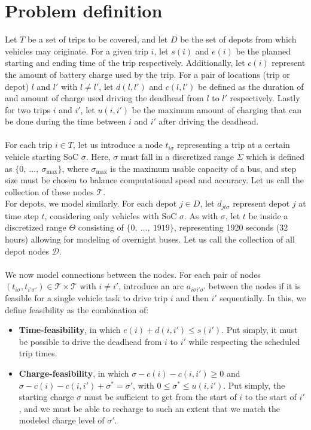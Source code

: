 \documentclass[]{article}
\begin{document}
\section{Problem definition}
\label{sec:problem_def}
Let $T$ be a set of trips to be covered, and let $D$ be the set of depots from which vehicles may originate. For a given trip $i$, let $s(i)$ and $e(i)$ be the planned starting and ending time of the trip respectively. Additionally, let $c(i)$ represent the amount of battery charge used by the trip. For a pair of locations (trip or depot) $l$ and $l'$ with $l \neq l'$, let $d(l, l')$ and $c(l, l')$ be defined as the duration of and amount of charge used driving the deadhead from $l$ to $l'$ respectively. Lastly for two trips $i$ and $i'$, let $u(i, i')$ be the maximum amount of charging that can be done during the time between $i$ and $i'$ after driving the deadhead.  \\\\
For each trip $i \in T$, let us introduce a node $t_{i\sigma}$ representing a trip at a certain vehicle starting SoC $\sigma$. Here, $\sigma$ must fall in a discretized range $\Sigma$ which is defined as $\{0,\:\dots,\:\sigma_{\max}\}$, where $\sigma_{\max}$ is the maximum usable capacity of a bus, and step size must be chosen to balance computational speed and accuracy. Let us call the collection of these nodes $\mathcal{T}$.\\
\noindent For depots, we model similarly. For each depot $j \in D$, let $d_{jt\sigma}$ represent depot $j$ at time step $t$, considering only vehicles with SoC $\sigma$. As with $\sigma$, let $t$ be inside a discretized range $\Theta$ consisting of $\{0,\:\dots,\:1919\}$, representing 1920 seconds (32 hours) allowing for modeling of overnight buses. Let us call the collection of all depot nodes $\mathcal{D}$. \\\\
We now model connections between the nodes. For each pair of nodes $(t_{i\sigma}, t_{i'\sigma'}) \in \mathcal{T} \times \mathcal{T}$ with $i \neq i'$, introduce an arc $a_{i\sigma i'\sigma'}$ between the nodes if it is feasible for a single vehicle task to drive trip $i$ and then $i'$ sequentially. In this, we define feasibility as the combination of:
\begin{itemize}
  \item \textbf{Time-feasibility}, in which $e(i) + d(i, i') \leq s(i')$. Put simply, it must be possible to drive the deadhead from $i$ to $i'$ while respecting the scheduled trip times.
  \item \textbf{Charge-feasibility}, in which $\sigma - c(i) - c(i, i') \geq 0$ and $\sigma - c(i) - c(i, i') + \sigma^* = \sigma'$, with $0 \leq \sigma^* \leq u(i, i')$. Put simply, the starting charge $\sigma$ must be sufficient to get from the start of $i$ to the start of $i'$, and we must be able to recharge to such an extent that we match the modeled charge level of $\sigma'$.
\end{itemize}
\end{document}
